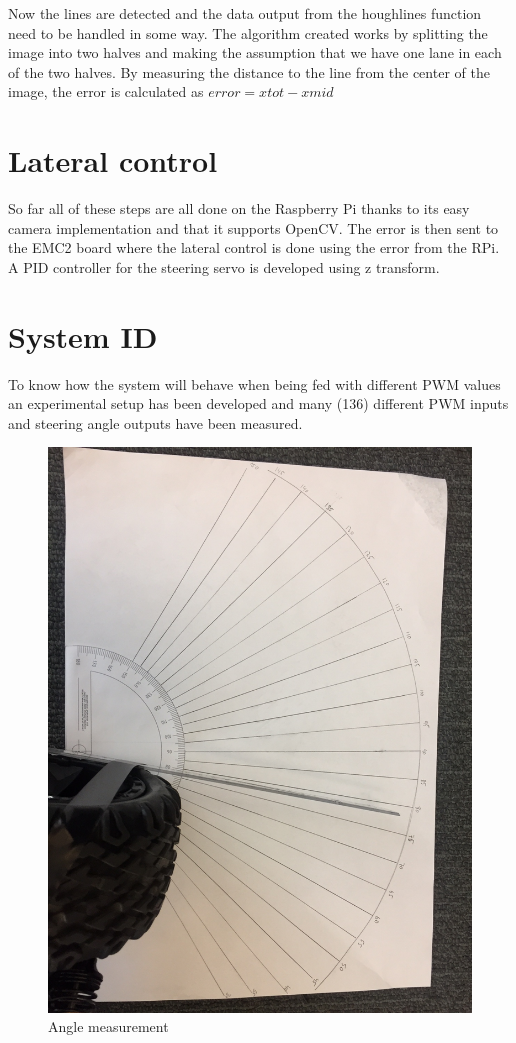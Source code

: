 Now the lines are detected and the data  output from the houghlines function need to be handled in some way. 
The algorithm created works by splitting the image into two halves and making the assumption that we have one lane in each of the two halves. By measuring the distance to the line from the center of the image, the error is calculated as $error = xtot - xmid$





\section{Lateral control}
So far all of these steps are all done on the Raspberry Pi thanks to its easy camera implementation and that it supports OpenCV. The error is then sent to the EMC2 board where the lateral control is done using the error from the RPi. A PID controller for the steering servo is developed using z transform.


\section{System ID}
To know how the system will behave when being fed with different PWM values an experimental setup has been developed and many (136) different PWM inputs and steering angle outputs have been measured.


\begin{figure}[H]
  \includegraphics[scale=0.25]{./img/anglepic.JPG}
  \centering
  \caption{Angle measurement}
  \label{fig:Angle measurement}
\end{figure}


